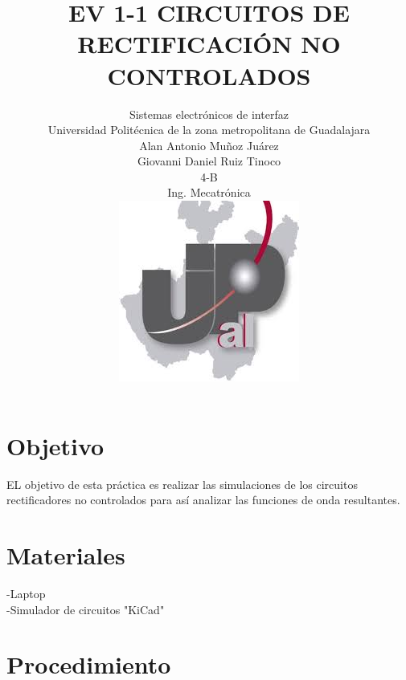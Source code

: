\documentclass[12pt,a4paper]{article}
\title{EV 1-1 CIRCUITOS DE RECTIFICACIÓN NO CONTROLADOS}
\author{Sistemas electrónicos de interfaz\\
  \small Universidad Politécnica de la zona metropolitana de Guadalajara\\
\small Alan Antonio Muñoz Juárez\\
\small Giovanni Daniel Ruiz Tinoco\\
  \small 4-B \\
  \small Ing. Mecatrónica\\
\centering
\includegraphics[scale=2]{imagenes/p1.jpg} 
}
\begin{document}
\maketitle
\newpage
\section {Objetivo}
EL objetivo de esta práctica es realizar las simulaciones de los circuitos rectificadores no controlados para así analizar las funciones de onda resultantes.
\section {Materiales}
-Laptop\\
-Simulador de circuitos "KiCad"\\
\section {Procedimiento}
\end{document}
